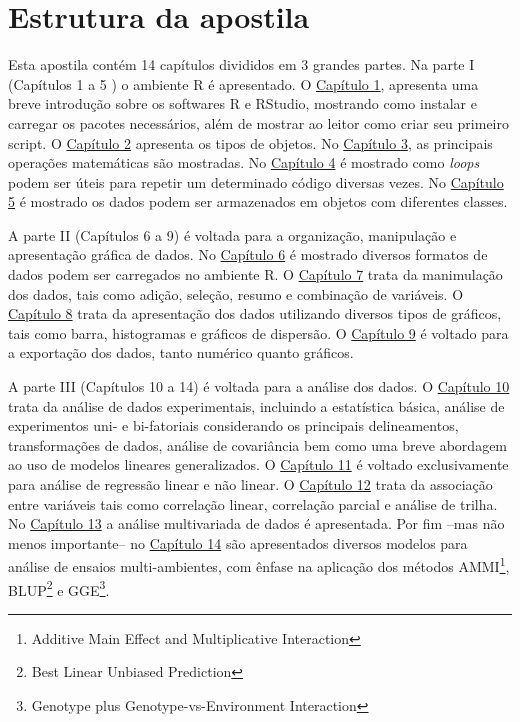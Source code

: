 \documentclass[]{book}
\let\rmarkdownfootnote\footnote%
\def\footnote{\protect\rmarkdownfootnote}
\begin{document}
\hypertarget{estrutura-da-apostila}{%
\chapter*{Estrutura da apostila}\label{estrutura-da-apostila}}

Esta apostila contém 14 capítulos divididos em 3 grandes partes. Na parte I (Capítulos 1 a 5 ) o ambiente R é apresentado. O \protect\hyperlink{intro}{Capítulo 1}, apresenta uma breve introdução sobre os softwares R e RStudio, mostrando como instalar e carregar os pacotes necessários, além de mostrar ao leitor como criar seu primeiro script. O \protect\hyperlink{objects}{Capítulo 2} apresenta os tipos de objetos. No \protect\hyperlink{math}{Capítulo 3}, as principais operações matemáticas são mostradas. No \protect\hyperlink{loops}{Capítulo 4} é mostrado como \emph{loops} podem ser úteis para repetir um determinado código diversas vezes. No \protect\hyperlink{dataframe}{Capítulo 5} é mostrado os dados podem ser armazenados em objetos com diferentes classes.

A parte II (Capítulos 6 a 9) é voltada para a organização, manipulação e apresentação gráfica de dados. No \protect\hyperlink{entrada}{Capítulo 6} é mostrado diversos formatos de dados podem ser carregados no ambiente R. O \protect\hyperlink{manipula}{Capítulo 7} trata da manimulação dos dados, tais como adição, seleção, resumo e combinação de variáveis. O \protect\hyperlink{graph}{Capítulo 8} trata da apresentação dos dados utilizando diversos tipos de gráficos, tais como barra, histogramas e gráficos de dispersão. O \protect\hyperlink{exporta}{Capítulo 9} é voltado para a exportação dos dados, tanto numérico quanto gráficos.

A parte III (Capítulos 10 a 14) é voltada para a análise dos dados. O \protect\hyperlink{analdata}{Capítulo 10} trata da análise de dados experimentais, incluindo a estatística básica, análise de experimentos uni- e bi-fatoriais considerando os principais delineamentos, transformações de dados, análise de covariância bem como uma breve abordagem ao uso de modelos lineares generalizados. O \protect\hyperlink{reg}{Capítulo 11} é voltado exclusivamente para análise de regressão linear e não linear. O \protect\hyperlink{relations}{Capítulo 12} trata da associação entre variáveis tais como correlação linear, correlação parcial e análise de trilha. No \protect\hyperlink{multivariate}{Capítulo 13} a análise multivariada de dados é apresentada. Por fim --mas não menos importante-- no \protect\hyperlink{interaction}{Capítulo 14} são apresentados diversos modelos para análise de ensaios multi-ambientes, com ênfase na aplicação dos métodos AMMI\footnote{Additive Main Effect and Multiplicative Interaction}, BLUP\footnote{Best Linear Unbiased Prediction} e GGE\footnote{Genotype plus Genotype-vs-Environment Interaction}.
\end{document}
